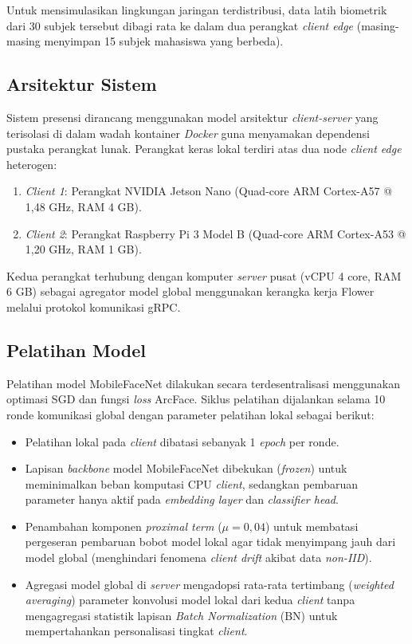 \documentclass[conference]{IEEEtran}
\begin{document}
Untuk mensimulasikan lingkungan jaringan terdistribusi, data latih biometrik dari 30 subjek tersebut dibagi rata ke dalam dua perangkat \textit{client edge} (masing-masing menyimpan 15 subjek mahasiswa yang berbeda).

\subsection{Arsitektur Sistem}
Sistem presensi dirancang menggunakan model arsitektur \textit{client-server} yang terisolasi di dalam wadah kontainer \textit{Docker} guna menyamakan dependensi pustaka perangkat lunak. Perangkat keras lokal terdiri atas dua node \textit{client edge} heterogen:
\begin{enumerate}
    \item \textit{Client 1}: Perangkat NVIDIA Jetson Nano (Quad-core ARM Cortex-A57 @ 1,48 GHz, RAM 4 GB).
    \item \textit{Client 2}: Perangkat Raspberry Pi 3 Model B (Quad-core ARM Cortex-A53 @ 1,20 GHz, RAM 1 GB).
\end{enumerate}
Kedua perangkat terhubung dengan komputer \textit{server} pusat (vCPU 4 core, RAM 6 GB) sebagai agregator model global menggunakan kerangka kerja Flower melalui protokol komunikasi gRPC.

\subsection{Pelatihan Model}
Pelatihan model MobileFaceNet dilakukan secara terdesentralisasi menggunakan optimasi SGD dan fungsi \textit{loss} ArcFace. Siklus pelatihan dijalankan selama 10 ronde komunikasi global dengan parameter pelatihan lokal sebagai berikut:
\begin{itemize}
    \item Pelatihan lokal pada \textit{client} dibatasi sebanyak 1 \textit{epoch} per ronde.
    \item Lapisan \textit{backbone} model MobileFaceNet dibekukan (\textit{frozen}) untuk meminimalkan beban komputasi CPU \textit{client}, sedangkan pembaruan parameter hanya aktif pada \textit{embedding layer} dan \textit{classifier head}.
    \item Penambahan komponen \textit{proximal term} ($\mu = 0,04$) untuk membatasi pergeseran pembaruan bobot model lokal agar tidak menyimpang jauh dari model global (menghindari fenomena \textit{client drift} akibat data \textit{non-IID}).
    \item Agregasi model global di \textit{server} mengadopsi rata-rata tertimbang (\textit{weighted averaging}) parameter konvolusi model lokal dari kedua \textit{client} tanpa mengagregasi statistik lapisan \textit{Batch Normalization} (BN) untuk mempertahankan personalisasi tingkat \textit{client}.
\end{itemize}
\end{document}
